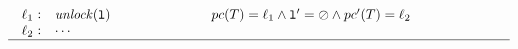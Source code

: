 \begin{description}
\[\begin{array}[t]{p{8em}@{\hspace{6em}}p{\longtablesize}}
				$\begin{array}[t]{l@{\hspace{0.3em}}c@{\hspace{1em}}l}
					\ell_1 & : & \mathtt{\fUnlock(l)} \\
					\ell_2 & : & \mathtt{\cdots}
				\end{array}$
				&
				$\begin{array}[t]{ll}
					\pc(T) = \ell_1 \andcond
						\mathtt{l}' = \oslash \andcond \pc'(T) = \ell_2
				 \end{array}$ \\ \hline
			 \end{array}
		\]

\end{description}
